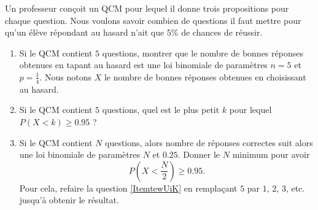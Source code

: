 
\begin{exercice}\label{exoPremiere-0092}

    Un professeur conçoit un QCM pour lequel il donne trois propositions pour chaque question. Nous voulons savoir combien de questions il faut mettre pour qu'un élève répondant au hasard n'ait que \( 5\%\) de chances de réussir.

    \begin{enumerate}
        \item
            Si le QCM contient \( 5\) questions, montrer que le nombre de bonnes réponses obtenues en tapant au hasard est une loi binomiale de paramètres \( n=5\) et \( p=\frac{1}{ 4 }\). Nous notons \( X\) le nombre de bonnes réponses obtenues en choisissant au hasard.
        \item   \label{ItemtewUiK}
            Si le QCM contient \( 5\) questions, quel est le plus petit \( k\) pour lequel \( P(X<k)\geq 0.95\) ?
        \item
            Si le QCM contient \( N\) questions, alors nombre de réponses correctes suit alors une loi binomiale de paramètres \( N\) et \( 0.25\). Donner le \( N\) minimum pour avoir 
            \begin{equation}
                P(X<\frac{ N }{ 2 })\geq 0.95.
            \end{equation}
            Pour cela, refaire la question \ref{ItemtewUiK} en remplaçant \( 5\) par \( 1\), \( 2\), \( 3\), etc. jusqu'à obtenir le résultat.
    \end{enumerate}

\end{exercice}

